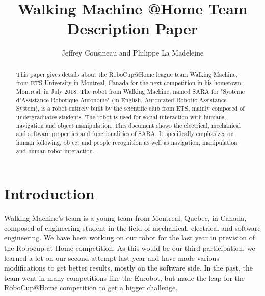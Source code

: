 \documentclass[runningheads,a4paper]{llncs}
\begin{document}
\newif\ifdraft
\draftfalse


\ifdraft
\setlength{\belowcaptionskip}{-5pt}
\fi

\title{Walking Machine @Home \newline {} Team Description Paper}

\author{Jeffrey Cousineau and Philippe La Madeleine}
\maketitle



\begin{abstract}

This paper gives details about the RoboCup@Home league team Walking Machine, from ETS University in Montreal, Canada for the next competition in his hometown, Montreal, in July 2018. The robot from Walking Machine, named SARA for "Système d’Assistance Robotique Autonome" (in English, Automated Robotic Assistance System), is a robot entirely built by the scientific club from ETS, mainly composed of undergraduates students. The robot is used for social interaction with humans, navigation and object manipulation. This document shows the electrical, mechanical and software properties and functionalities of SARA. It specifically emphasizes on human following, object and people recognition as well as navigation, manipulation and human-robot interaction.

\end{abstract}


\section{Introduction}
\tab Walking Machine’s team is a young team from Montreal, Quebec, in Canada, composed of engineering student in the field of mechanical, electrical and software engineering. We have been working on our robot for the last year in prevision of the Robocup at Home competition. As this would be our third participation, we learned a lot on our second attempt last year and have made various modifications to get better results, mostly on the software side. In the past, the team went in many competitions like the Eurobot, but made the leap for the RoboCup@Home competition to get a bigger challenge. \\
\end{document}
